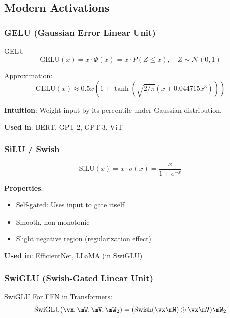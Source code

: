 \subsection{Modern Activations}

\subsubsection{GELU (Gaussian Error Linear Unit)}

\begin{mathresult}{GELU}
\begin{equation}
\text{GELU}(x) = x \cdot \Phi(x) = x \cdot P(Z \leq x), \quad Z \sim \mathcal{N}(0, 1)
\end{equation}

Approximation:
\begin{equation}
\text{GELU}(x) \approx 0.5x\left(1 + \tanh\left(\sqrt{2/\pi}(x + 0.044715x^3)\right)\right)
\end{equation}
\end{mathresult}

\textbf{Intuition}: Weight input by its percentile under Gaussian distribution.

\textbf{Used in}: BERT, GPT-2, GPT-3, ViT

\subsubsection{SiLU / Swish}

\begin{equation}
\text{SiLU}(x) = x \cdot \sigma(x) = \frac{x}{1 + e^{-x}}
\end{equation}

\textbf{Properties}:
\begin{itemize}
    \item Self-gated: Uses input to gate itself
    \item Smooth, non-monotonic
    \item Slight negative region (regularization effect)
\end{itemize}

\textbf{Used in}: EfficientNet, LLaMA (in SwiGLU)

\subsubsection{SwiGLU (Swish-Gated Linear Unit)}

\begin{mathresult}{SwiGLU}
For FFN in Transformers:
\begin{equation}
\text{SwiGLU}(\vx, \mW, \mV, \mW_2) = (\text{Swish}(\vx\mW) \odot \vx\mV) \mW_2
\end{equation}
\end{mathresult}


